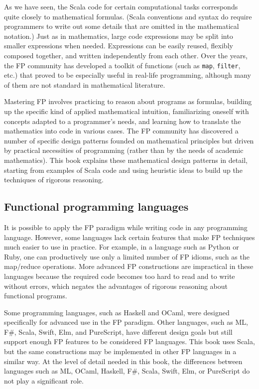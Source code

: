As we have seen, the Scala code for certain computational tasks corresponds
quite closely to mathematical formulas. (Scala conventions and syntax
do require programmers to write out some details that are omitted
in the mathematical notation.) Just as in mathematics, large code
expressions may be split into smaller expressions when needed. Expressions
can be easily reused, flexibly composed together, and written independently
from each other. Over the years, the FP community has developed a
toolkit of functions (such as \lstinline!map!, \texttt{}\lstinline!filter!,
etc.) that proved to be especially useful in real-life programming,
although many of them are not standard in mathematical literature.

Mastering FP involves practicing to reason about programs as formulas,
building up the specific kind of applied mathematical intuition, familiarizing
oneself with concepts adapted to a programmer\textsf{'}s needs, and learning
how to translate the mathematics into code in various cases. The FP
community has discovered a number of specific design patterns founded
on mathematical principles but driven by practical necessities of
programming (rather than by the needs of academic mathematics). This
book explains these mathematical design patterns in detail, starting
from examples of Scala code and using heuristic ideas to build up
the techniques of rigorous reasoning.

\subsection{Functional programming languages}

It is possible to apply the FP paradigm while writing code in any
programming language. However, some languages lack certain features
that make FP techniques much easier to use in practice. For example,
in a language such as Python or Ruby, one can productively use only
a limited number of FP idioms, such as the map/reduce operations.
More advanced FP constructions are impractical in these languages
because the required code becomes too hard to read and to write without
errors, which negates the advantages of rigorous reasoning about functional
programs.

Some programming languages, such as Haskell and OCaml, were designed
specifically for advanced use in the FP paradigm. Other languages,
such as ML, F\#, Scala, Swift, Elm, and PureScript, have different
design goals but still support enough FP features to be considered
FP languages. This book uses Scala, but the same constructions may
be implemented in other FP languages in a similar way. At the level
of detail needed in this book, the differences between languages such
as ML, OCaml, Haskell, F\#, Scala, Swift, Elm, or PureScript do not
play a significant role.

